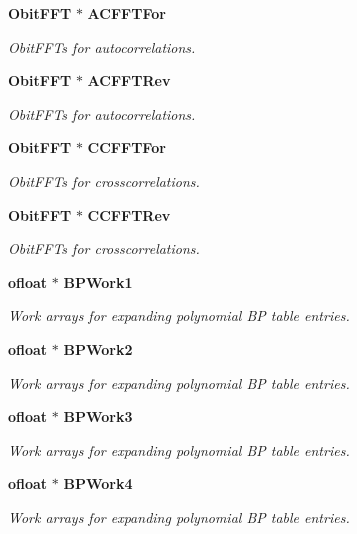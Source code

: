 \begin{CompactItemize}
{\bf Obit\-FFT} $\ast$ {\bf ACFFTFor}
\begin{CompactList}\small\item\em Obit\-FFTs for autocorrelations. \item\end{CompactList}\item 
{\bf Obit\-FFT} $\ast$ {\bf ACFFTRev}
\begin{CompactList}\small\item\em Obit\-FFTs for autocorrelations. \item\end{CompactList}\item 
{\bf Obit\-FFT} $\ast$ {\bf CCFFTFor}
\begin{CompactList}\small\item\em Obit\-FFTs for crosscorrelations. \item\end{CompactList}\item 
{\bf Obit\-FFT} $\ast$ {\bf CCFFTRev}
\begin{CompactList}\small\item\em Obit\-FFTs for crosscorrelations. \item\end{CompactList}\item 
{\bf ofloat} $\ast$ {\bf BPWork1}
\begin{CompactList}\small\item\em Work arrays for expanding polynomial BP table entries. \item\end{CompactList}\item 
{\bf ofloat} $\ast$ {\bf BPWork2}
\begin{CompactList}\small\item\em Work arrays for expanding polynomial BP table entries. \item\end{CompactList}\item 
{\bf ofloat} $\ast$ {\bf BPWork3}
\begin{CompactList}\small\item\em Work arrays for expanding polynomial BP table entries. \item\end{CompactList}\item 
{\bf ofloat} $\ast$ {\bf BPWork4}
\begin{CompactList}\small\item\em Work arrays for expanding polynomial BP table entries. \item\end{CompactList}\item 

\end{CompactItemize}
